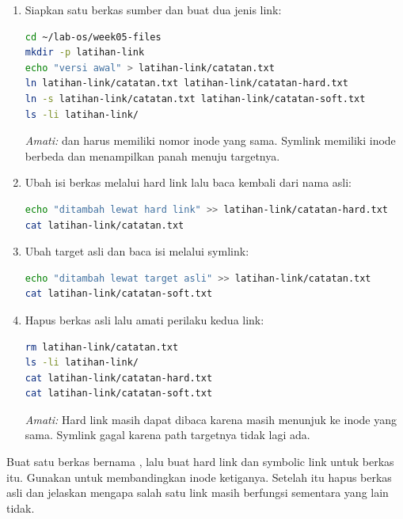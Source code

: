 \begin{enumerate}
    \item Siapkan satu berkas sumber dan buat dua jenis link:
\begin{lstlisting}[language=bash, caption={Membuat hard link dan symbolic link}]
cd ~/lab-os/week05-files
mkdir -p latihan-link
echo "versi awal" > latihan-link/catatan.txt
ln latihan-link/catatan.txt latihan-link/catatan-hard.txt
ln -s latihan-link/catatan.txt latihan-link/catatan-soft.txt
ls -li latihan-link/
\end{lstlisting}
    \textit{Amati:}  dan  harus memiliki nomor inode yang sama. Symlink memiliki inode berbeda dan menampilkan panah menuju targetnya.

    \item Ubah isi berkas melalui hard link lalu baca kembali dari nama asli:
\begin{lstlisting}[language=bash, caption={Mengubah isi melalui hard link}]
echo "ditambah lewat hard link" >> latihan-link/catatan-hard.txt
cat latihan-link/catatan.txt
\end{lstlisting}

    \item Ubah target asli dan baca isi melalui symlink:
\begin{lstlisting}[language=bash, caption={Membaca target melalui symbolic link}]
echo "ditambah lewat target asli" >> latihan-link/catatan.txt
cat latihan-link/catatan-soft.txt
\end{lstlisting}

    \item Hapus berkas asli lalu amati perilaku kedua link:
\begin{lstlisting}[language=bash, caption={Menghapus target asli}]
rm latihan-link/catatan.txt
ls -li latihan-link/
cat latihan-link/catatan-hard.txt
cat latihan-link/catatan-soft.txt
\end{lstlisting}
    \textit{Amati:} Hard link masih dapat dibaca karena masih menunjuk ke inode yang sama. Symlink gagal karena path targetnya tidak lagi ada.
\end{enumerate}

\begin{challengebox}
Buat satu berkas bernama , lalu buat hard link dan symbolic link untuk
berkas itu. Gunakan  untuk membandingkan inode ketiganya. Setelah itu hapus
berkas asli dan jelaskan mengapa salah satu link masih berfungsi sementara yang lain tidak.
\end{challengebox}

